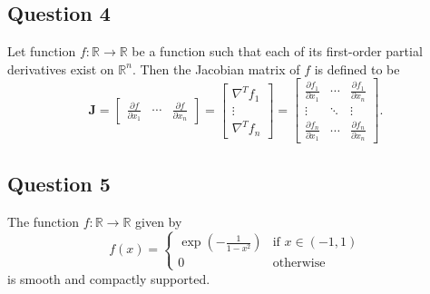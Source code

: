 \documentclass[12pt]{article}
\begin{document}
\subsection{Question 4}
Let function $f:\mathbb{R}\rightarrow\mathbb{R}$ be a function such that each of its first-order partial derivatives exist on $\mathbb{R}^n$. Then the Jacobian matrix of $f$ is defined to be \[\mathbf{J}=\begin{bmatrix}
    \frac{\partial f}{\partial x_1} & \cdots & \frac{\partial f}{\partial x_n}
\end{bmatrix}=\begin{bmatrix}
    \nabla^Tf_1\\
    \vdots\\
    \nabla^Tf_n
\end{bmatrix}=\begin{bmatrix}
    \frac{\partial f_1}{\partial x_1} & \cdots & \frac{\partial f_1}{\partial x_n}\\
    \vdots & \ddots & \vdots\\
    \frac{\partial f_n}{\partial x_1} & \cdots & \frac{\partial f_n}{\partial x_n}
\end{bmatrix}.\]
\subsection{Question 5}
The function $f:\mathbb{R}\rightarrow\mathbb{R}$ given by \[f(x)=\left\{\begin{array}{ll}
    \exp(-\frac{1}{1-x^2}) & \text{if } x\in (-1,1) \\
    0 & \text{otherwise}
\end{array}\right.\] is smooth and compactly supported.
\end{document}
